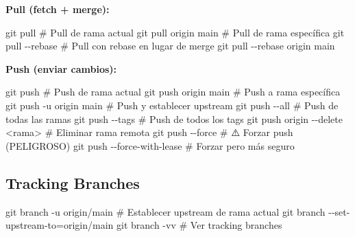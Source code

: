 \documentclass[
  doc,
  floatsintext,
  longtable,
  a4paper,
  nolmodern,
  notxfonts,
  notimes,
  12pt,
  colorlinks=true,linkcolor=blue,citecolor=blue,urlcolor=blue]{apa7}
\newenvironment{Shaded}{\begin{snugshade}}{\end{snugshade}}
\newcommand{\AttributeTok}[1]{\textcolor[rgb]{0.40,0.45,0.13}{#1}}
\newcommand{\CommentTok}[1]{\textcolor[rgb]{0.37,0.37,0.37}{#1}}
\newcommand{\FunctionTok}[1]{\textcolor[rgb]{0.28,0.35,0.67}{#1}}
\newcommand{\NormalTok}[1]{\textcolor[rgb]{0.00,0.23,0.31}{#1}}
\newcommand{\OperatorTok}[1]{\textcolor[rgb]{0.37,0.37,0.37}{#1}}
\begin{document}
\textbf{Pull (fetch + merge):}

\begin{Shaded}
\begin{Highlighting}[]
\FunctionTok{git}\NormalTok{ pull                   }\CommentTok{\# Pull de rama actual}
\FunctionTok{git}\NormalTok{ pull origin main       }\CommentTok{\# Pull de rama específica}
\FunctionTok{git}\NormalTok{ pull }\AttributeTok{{-}{-}rebase}          \CommentTok{\# Pull con rebase en lugar de merge}
\FunctionTok{git}\NormalTok{ pull }\AttributeTok{{-}{-}rebase}\NormalTok{ origin main}
\end{Highlighting}
\end{Shaded}

\textbf{Push (enviar cambios):}

\begin{Shaded}
\begin{Highlighting}[]
\FunctionTok{git}\NormalTok{ push                     }\CommentTok{\# Push de rama actual}
\FunctionTok{git}\NormalTok{ push origin main         }\CommentTok{\# Push a rama específica}
\FunctionTok{git}\NormalTok{ push }\AttributeTok{{-}u}\NormalTok{ origin main      }\CommentTok{\# Push y establecer upstream}
\FunctionTok{git}\NormalTok{ push }\AttributeTok{{-}{-}all}               \CommentTok{\# Push de todas las ramas}
\FunctionTok{git}\NormalTok{ push }\AttributeTok{{-}{-}tags}              \CommentTok{\# Push de todos los tags}
\FunctionTok{git}\NormalTok{ push origin }\AttributeTok{{-}{-}delete} \OperatorTok{\textless{}}\NormalTok{rama}\OperatorTok{\textgreater{}}  \CommentTok{\# Eliminar rama remota}
\FunctionTok{git}\NormalTok{ push }\AttributeTok{{-}{-}force}             \CommentTok{\# ⚠️ Forzar push (PELIGROSO)}
\FunctionTok{git}\NormalTok{ push }\AttributeTok{{-}{-}force{-}with{-}lease}  \CommentTok{\# Forzar pero más seguro}
\end{Highlighting}
\end{Shaded}

\subsection{Tracking Branches}\label{tracking-branches}

\begin{Shaded}
\begin{Highlighting}[]
\FunctionTok{git}\NormalTok{ branch }\AttributeTok{{-}u}\NormalTok{ origin/main  }\CommentTok{\# Establecer upstream de rama actual}
\FunctionTok{git}\NormalTok{ branch }\AttributeTok{{-}{-}set{-}upstream{-}to}\OperatorTok{=}\NormalTok{origin/main}
\FunctionTok{git}\NormalTok{ branch }\AttributeTok{{-}vv}             \CommentTok{\# Ver tracking branches}
\end{Highlighting}
\end{Shaded}
\end{document}
